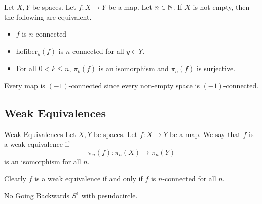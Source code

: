 \documentclass[a4paper]{article}
\begin{document}
\begin{prp}{}{} Let $X,Y$ be spaces. Let $f:X\to Y$ be a map. Let $n\in\mathbb{N}$. If $X$ is not empty, then the following are equivalent. 
\begin{itemize}
\item $f$ is $n$-connected
\item $\text{hofiber}_y(f)$ is $n$-connected for all $y\in Y$. 
\item For all $0<k\leq n$, $\pi_k(f)$ is an isomorphism and $\pi_n(f)$ is surjective. 
\end{itemize}
\end{prp}

Every map is $(-1)$-connected since every non-empty space is $(-1)$-connected. 

\subsection{Weak Equivalences}
\begin{defn}{Weak Equivalences}{} Let $X,Y$ be spaces. Let $f:X\to Y$ be a map. We say that $f$ is a weak equivalence if $$\pi_n(f):\pi_n(X)\to\pi_n(Y)$$ is an isomorphism for all $n$. 
\end{defn}

Clearly $f$ is a weak equivalence if and only if $f$ is $n$-connected for all $n$. 

\begin{eg}{No Going Backwards}{} $S^1$ with pesudocircle. 
\end{eg}
\end{document}
